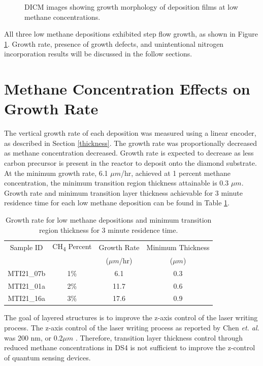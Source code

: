 \begin{figure}
    \centering
    
    \caption{DICM images showing growth morphology of deposition films at low methane concentrations.}
    \label{fig:DICMLowCH4}
\end{figure}

All three low methane depositions exhibited step flow growth, as shown in Figure \ref{fig:DICMLowCH4}. Growth rate, presence of growth defects, and unintentional nitrogen incorporation results will be discussed in the follow sections. 

\section{Methane Concentration Effects on Growth Rate}
\indent

The vertical growth rate of each deposition was measured using a linear encoder, as described in Section \ref{thickness}. The growth rate was proportionally decreased as methane concentration decreased. Growth rate is expected to decrease as less carbon precursor is present in the reactor to deposit onto the diamond substrate. At the minimum growth rate, 6.1 $\mu m$/hr, achieved at 1 percent methane concentration, the minimum transition region thickness attainable is 0.3 $\mu m$. Growth rate and minimum transition layer thickness achievable for 3 minute residence time for each low methane deposition can be found in Table \ref{tab:LowCH4DepoSummary}.

\begin{table}
    \centering
    \begin{tabular}{c|ccc}
        Sample ID & CH\textsubscript{4} Percent & Growth Rate & Minimum Thickness \\
        & & ($\mu m$/hr)& ($\mu m$)\\
        \hline
        MTI21\_07b & 1\% & 6.1 & 0.3\\
        MTI21\_01a & 2\% & 11.7 & 0.6\\
        MTI21\_16a & 3\% & 17.6 & 0.9\\
    \end{tabular}
    \caption{Growth rate for low methane depositions and minimum transition region thickness for 3 minute residence time.}
    \label{tab:LowCH4DepoSummary}
\end{table}

The goal of layered structures is to improve the z-axis control of the laser writing process. The z-axis control of the laser writing process as reported by Chen \textit{et. al.} was 200 nm, or 0.2$\mu m$ \cite{Chen2019}. Therefore, transition layer thickness control through reduced methane concentrations in DS4 is not sufficient to improve the z-control of quantum sensing devices.

